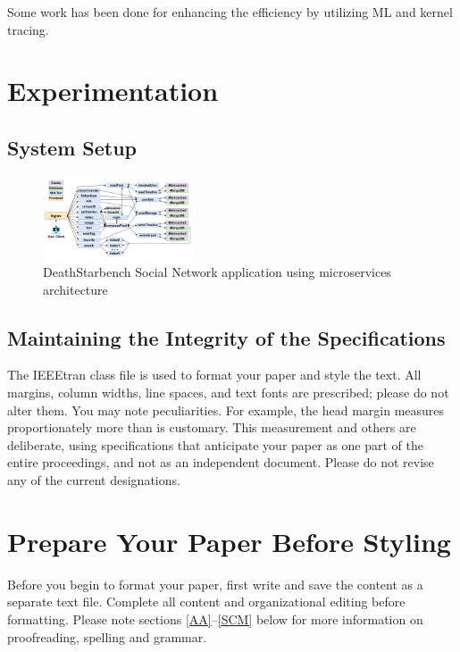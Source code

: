 \documentclass[conference]{IEEEtran}
\begin{document}
Some work has been done for enhancing the efficiency by utilizing ML and kernel tracing.


\section{Experimentation}

\subsection{System Setup}

\begin{figure}
    \begin{center}
        \includegraphics[width=0.4\textwidth]{figures/social-network.png}
    \end{center}
    \caption{DeathStarbench\cite{b2} Social Network application using microservices architecture}
    \label{fig:social-network}
\end{figure}


\subsection{Maintaining the Integrity of the Specifications}

The IEEEtran class file is used to format your paper and style the text. All margins, 
column widths, line spaces, and text fonts are prescribed; please do not 
alter them. You may note peculiarities. For example, the head margin
measures proportionately more than is customary. This measurement 
and others are deliberate, using specifications that anticipate your paper 
as one part of the entire proceedings, and not as an independent document. 
Please do not revise any of the current designations.

\section{Prepare Your Paper Before Styling}
Before you begin to format your paper, first write and save the content as a 
separate text file. Complete all content and organizational editing before 
formatting. Please note sections \ref{AA}--\ref{SCM} below for more information on 
proofreading, spelling and grammar.
\end{document}
